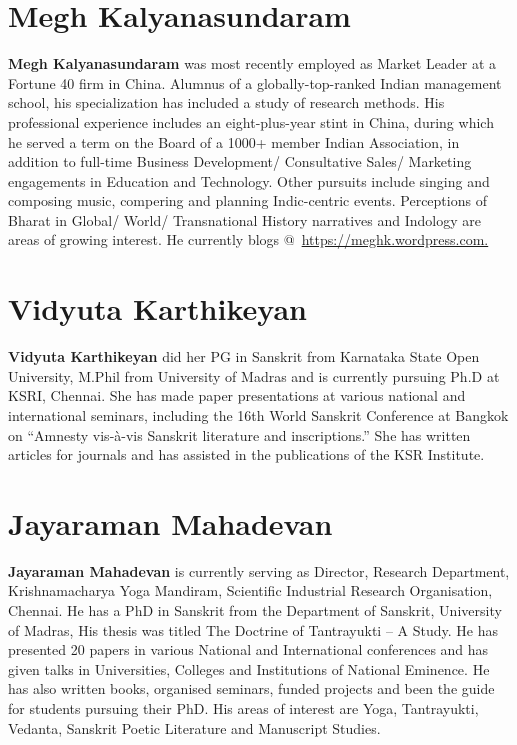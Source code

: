 \section*{Megh Kalyanasundaram}

\textbf{Megh Kalyanasundaram} was most recently employed as Market Leader at a Fortune 40 firm in China. Alumnus of a globally-top-ranked Indian management school, his specialization has included a study of research methods. His professional experience includes an eight-plus-year stint in China, during which he served a term on the Board of a 1000+ member Indian Association, in addition to full-time Business Development/ Consultative Sales/ Marketing engagements in Education and Technology. Other pursuits include singing and composing music, compering and planning Indic-centric events. Perceptions of Bharat in Global/ World/ Transnational History narratives and Indology are areas of growing interest. He currently blogs @ \url{https://meghk.wordpress.com.}

\section*{Vidyuta Karthikeyan}

\vskip -2pt

\textbf{Vidyuta Karthikeyan} did her PG in Sanskrit from Karnataka State Open University, M.Phil from University of Madras and is currently pursuing Ph.D at KSRI, Chennai. She has made paper presentations at various national and international seminars, including the 16th World Sanskrit Conference at Bangkok on “Amnesty vis-à-vis Sanskrit literature and inscriptions.” She has written articles for journals and has assisted in the publications of the KSR Institute.

\section*{Jayaraman Mahadevan}

\textbf{Jayaraman Mahadevan} is currently serving as Director, Research Department, Krishnamacharya Yoga Mandiram, Scientific Industrial Research Organisation, Chennai. He has a PhD in Sanskrit from the Department of Sanskrit, University of Madras, His thesis was titled The Doctrine of Tantrayukti – A Study. He has presented 20 papers in various National and International conferences and has given talks in Universities, Colleges and Institutions of National Eminence. He has also written books, organised seminars, funded projects and been the guide for students pursuing their PhD. His areas of interest are Yoga, Tantrayukti, Vedanta, Sanskrit Poetic Literature and Manuscript Studies.

